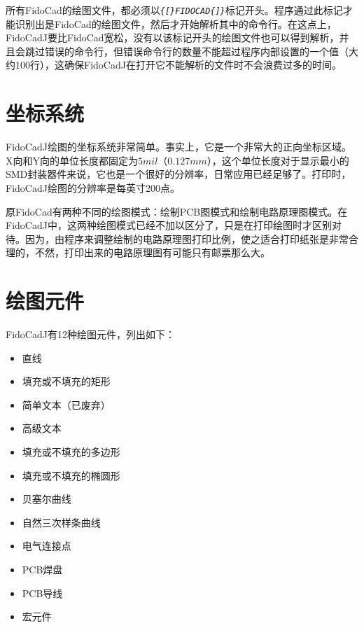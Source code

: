 \documentclass[10pt,a4paper,twoside]{scrreprt}
\begin{document}
所有FidoCad\emph{}的绘图文件，都必须以\emph{\lstinline!{[}FIDOCAD{]}!}标记开头。程序通过此标记才能识别出是FidoCad\emph{}的绘图文件，然后才开始解析其中的命令行。在这点上，FidoCadJ要比FidoCad宽松，没有以该标记开头\emph{}的绘图文件也可以得到解析，并且会跳过错误的命令行，但错误命令行的数量不能超过程序内部设置的一个值（大约100行），这确保FidoCadJ在打开它不能解析的文件时不会浪费过多的时间。

\section{坐标系统}

FidoCadJ绘图的坐标系统\emph{}非常简单。事实上，它是一个非常大的正向坐标区域。X向和Y向的单位长度都固定为\emph{$5mil$}（\emph{$0.127mm$}），这个单位长度对于显示最小的SMD封装器件来说，它也是一个很好的分辨率，日常应用已经足够了。打印时，FidoCadJ绘图的分辨率是每英寸200点。

原FidoCad\emph{}有两种不同的绘图模式：绘制PCB图\emph{}模式和绘制电路原理图模式。在FidoCadJ中，这两种绘图模式已经不加以区分了，只是在打印绘图时才区别对待。因为，由程序来调整绘制的电路原理图打印比例，使之适合打印纸张是非常合理的，不然，打印出来的电路原理图有可能只有邮票那么大。

\section{绘图元件}

\label{sec_primitive}
FidoCadJ有12种绘图元件，列出如下：
\begin{itemize}
\item 直线
\item 填充或不填充的矩形 
\item 简单文本（已废弃）
\item 高级文本
\item 填充或不填充的多边形
\item 填充或不填充的椭圆形 
\item 贝塞尔曲线 
\item 自然三次样条曲线
\item 电气连接点
\item PCB焊盘
\item PCB导线
\item 宏元件
\end{itemize}
\end{document}
